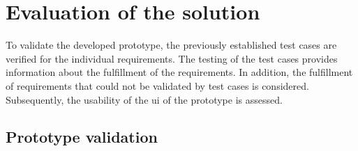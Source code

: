 \section{Evaluation of the solution}

To validate the developed prototype, the previously established test cases are verified for the individual requirements. The testing of the test cases provides information about the fulfillment of the requirements. In addition, the fulfillment of requirements that could not be validated by test cases is considered. Subsequently, the usability of the \ac{ui} of the prototype is assessed.

\subsection{Prototype validation}

